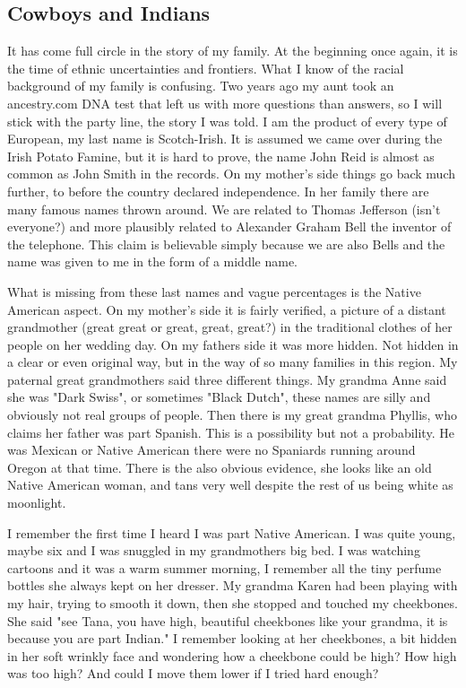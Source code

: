 \documentclass[
    a4paper,
    12pt,
    man,
    donotrepeattitle
]{apa6}
\begin{document}
\subsection{Cowboys and Indians}

It has come full circle in the story of my family. At the beginning once again,
it is the time of ethnic uncertainties and frontiers. What I know of the racial
background of my family is confusing. Two years ago my aunt took
an ancestry.com DNA test that left us with more questions than answers, so
I will stick with the party line, the story I was told. I am the product of
every type of European, my last name is Scotch-Irish. It is assumed we came
over during the Irish Potato Famine, but it is hard to prove, the name John
Reid is almost as common as John Smith in the records. On my mother's side
things go back much further, to before the country declared independence. In
her family there are many famous names thrown around. We are related to Thomas
Jefferson (isn't everyone?) and more plausibly related to Alexander Graham Bell
the inventor of the telephone. This claim is believable simply because we are
also Bells and the name was given to me in the form of a middle name.

What is missing from these last names and vague percentages is the Native
American aspect. On my mother's side it is fairly verified, a picture of
a distant grandmother (great great or great, great, great?) in the traditional
clothes of her people on her wedding day. On my fathers side it was more
hidden. Not hidden in a clear or even original way, but in the way of so many
families in this region. My paternal great grandmothers said three different
things. My grandma Anne said she was "Dark Swiss", or sometimes "Black Dutch",
these names are silly and obviously not real groups of people. Then there is my
great grandma Phyllis, who claims her father was part Spanish. This is
a possibility but not a probability. He was Mexican or Native American there
were no Spaniards running around Oregon at that time. There is the also
obvious evidence, she looks like an old Native American woman, and tans very
well despite the rest of us being white as moonlight.

I remember the first time I heard I was part Native American. I was quite
young, maybe six and I was snuggled in my grandmothers big bed. I was watching
cartoons and it was a warm summer morning, I remember all the tiny perfume
bottles she always kept on her dresser. My grandma Karen had been playing with
my hair, trying to smooth it down, then she stopped and touched my cheekbones.
She said "see Tana, you have high, beautiful cheekbones like your grandma, it
is because you are part Indian." I remember looking at her cheekbones, a bit
hidden in her soft wrinkly face and wondering how a cheekbone could be high?
How high was too high? And could I move them lower if I tried hard enough?
\end{document}
